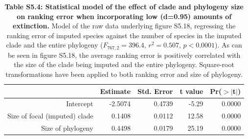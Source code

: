 \documentclass[10pt,english]{article}
\begin{document}
\begin{table}[ht]
  \centering
  \begin{tabular}{rrrrr}
    \hline
    & Estimate & Std. Error & t value & Pr($>$$|$t$|$) \\ \hline
    Intercept & -2.5074 & 0.4739 & -5.29 & 0.0000 \\
    Size of focal (imputed) clade & 0.1408 & 0.0112 & 12.58 & 0.0000 \\
    Size of phylogeny & 0.4498 & 0.0179 & 25.19 & 0.0000 \\
    \hline
  \end{tabular}
  \caption*{\textbf{Table S5.4: Statistical model of the effect of clade and
      phylogeny size on ranking error when incorporating low (d=0.95) amounts of
      extinction.} Model of the raw data underlying figure S5.18, regressing the
      ranking error of imputed species against the number of species in the
      imputed clade and the entire phylogeny ($F_{767,2} = 396.4$, $r^2 =
      0.507$, $p < 0.0001$). As can be seen in figure S5.18, the average
      ranking error is positively correlated with the size of the clade being
      imputed and the entire phylogeny. Square-root transformations have been
      applied to both ranking error and size of phylogeny.}
\end{table}
\end{document}
